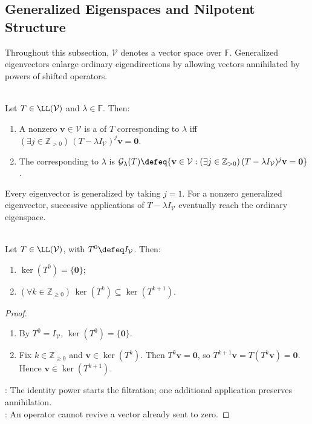 \subsection{Generalized Eigenspaces and Nilpotent Structure}

Throughout this subsection, $\mathcal{V}$ denotes a vector space over $\mathbb{F}$. Generalized eigenvectors enlarge ordinary eigendirections by allowing vectors annihilated by powers of shifted operators.

\begin{definition} \label{def:generalized-eigenvector-and-eigenspace} \\
Let $T\in\LL(\mathcal{V})$ and $\lambda\in\mathbb{F}$. Then:
\begin{enumerate}[label=(\roman*)]
\setlength{\itemsep}{0pt}
\item A nonzero $\mathbf{v}\in\mathcal{V}$ is a  of $T$ corresponding to $\lambda$ iff $(\exists j\in\mathbb{Z}_{>0})\,(T-\lambda I_{\mathcal{V}})^j\mathbf{v}=\mathbf{0}$.
\item The  corresponding to $\lambda$ is $\mathcal{G}_{\lambda}(T)\defeq\{\mathbf{v}\in\mathcal{V}:(\exists j\in\mathbb{Z}_{>0})\,(T-\lambda I_{\mathcal{V}})^j\mathbf{v}=\mathbf{0}\}$.
\end{enumerate}
\end{definition}

Every eigenvector is generalized by taking $j=1$. For a nonzero generalized eigenvector, successive applications of $T-\lambda I_{\mathcal{V}}$ eventually reach the ordinary eigenspace.

\begin{proposition} \label{prop:kernels-of-powers-increase} \\
Let $T\in\LL(\mathcal{V})$, with $T^0\defeq I_{\mathcal{V}}$. Then:
\begin{enumerate}[label=(\roman*)]
\setlength{\itemsep}{0pt}
\item $\ker(T^0)=\{\mathbf{0}\}$;
\item $(\forall k\in\mathbb{Z}_{\geq0})\,\ker(T^k)\subseteq\ker(T^{k+1})$.
\end{enumerate}
\begin{proof}
\begin{enumerate}[label=(\roman*)]
\setlength{\itemsep}{0pt}
\item By $T^0=I_{\mathcal{V}}$, $\ker(T^0)=\{\mathbf{0}\}$.
\item Fix $k\in\mathbb{Z}_{\geq0}$ and $\mathbf{v}\in\ker(T^k)$. Then $T^k\mathbf{v}=\mathbf{0}$, so $T^{k+1}\mathbf{v}=T(T^k\mathbf{v})=\mathbf{0}$. Hence $\mathbf{v}\in\ker(T^{k+1})$.
\end{enumerate}
: The identity power starts the filtration; one additional application preserves annihilation.\\
: An operator cannot revive a vector already sent to zero.
\end{proof}
\end{proposition}

